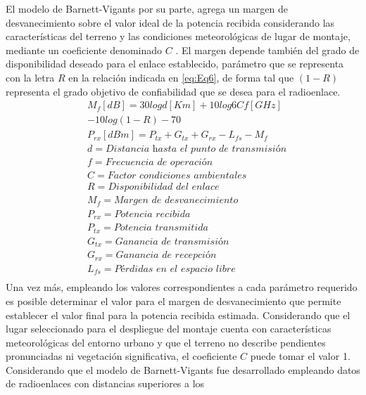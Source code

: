 \documentclass[conference]{IEEEtran}
\begin{document}
El modelo de Barnett-Vigants por su parte, agrega un margen de desvanecimiento sobre el valor ideal de
la potencia recibida considerando las características del terreno y las condiciones meteorológicas de lugar
de montaje, mediante un coeficiente denominado $C$ \cite{b3}. El margen depende también del grado de disponibilidad deseado 
para el enlace establecido, parámetro que se representa con la letra $R$ en la relación indicada en \ref{eq:Eq6}, de forma 
tal que $(1-R)$ representa el grado objetivo de confiabilidad que se desea para el radioenlace. 
\begin{equation}
    \label{eq:Eq6}
    \begin{aligned}
        &M_{f}[dB] = 30logd[Km] + 10log6Cf[GHz]\\
        & - 10log(1-R) - 70\\
        &P_{rx}[dBm] = P_{tx} + G_{tx} + G_{rx} - L_{fs} - M_{f}\\
        &d = \textit{Distancia hasta el punto de transmisión}\\
        &f = \textit{Frecuencia de operación}\\
        &C = \textit{Factor condiciones ambientales}\\
        &R = \textit{Disponibilidad del enlace}\\
        &M_{f} = \textit{Margen de desvanecimiento}\\
        &P_{rx} = \textit{Potencia recibida}\\
        &P_{tx} = \textit{Potencia transmitida}\\
        &G_{tx} = \textit{Ganancia de transmisión}\\
        &G_{rx} = \textit{Ganancia de recepción}\\
        &L_{fs} = \textit{Pérdidas en el espacio libre}\\
    \end{aligned}
\end{equation}
Una vez más, empleando los valores correspondientes a cada parámetro requerido es posible determinar el valor
para el margen de desvanecimiento que permite establecer el valor final para la potencia recibida estimada. Considerando
que el lugar seleccionado para el despliegue del montaje cuenta con características meteorológicas del entorno urbano y
que el terreno no describe pendientes pronunciadas ni vegetación significativa, el coeficiente $C$ puede tomar el valor 1.
Considerando que el modelo de Barnett-Vigants fue desarrollado empleando datos de radioenlaces con distancias superiores a los 
\end{document}
